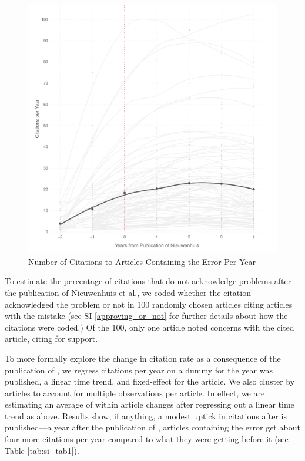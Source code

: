 \documentclass[12pt, letterpaper]{article}
\begin{document}
\begin{figure}[H]
\centering
 \includegraphics[scale=.7]{../figs/nw_growth_curve.pdf}
 \caption{Number of Citations to Articles Containing the Error Per Year}
 \label{fig:niewenhuis}
\end{figure}

To estimate the percentage of citations that do not acknowledge problems after the publication of Nieuwenhuis et al., we coded whether the citation acknowledged the problem or not in 100 randomly chosen articles citing articles with the mistake (see SI \ref{approving_or_not} for further details about how the citations were coded.) Of the 100, only one article noted concerns with the cited article, citing \citep{nieuwenhuis2011} for support.

To more formally explore the change in citation rate as a consequence of the publication of \citet{nieuwenhuis2011}, we regress citations per year on a dummy for the year \citet{nieuwenhuis2011} was published, a linear time trend, and fixed-effect for the article. We also cluster by articles to account for multiple observations per article. In effect, we are estimating an average of within article changes after regressing out a linear time trend as above. Results show, if anything, a modest uptick in citations after \citet{nieuwenhuis2011} is published---a year after the publication of \citet{nieuwenhuis2011}, articles containing the error get about four more citations per year compared to what they were getting before it (see Table \ref{tab:si_tab1}).
\end{document}
